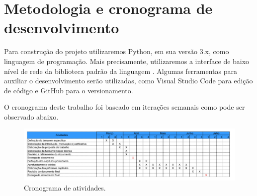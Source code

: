 \chapter{\label{chap:chap4} Metodologia e cronograma de desenvolvimento}
Para construção do projeto utilizaremos Python\cite{python}, em sua versão 3.x, como linguagem de programação.
Mais precisamente, utilizaremos a interface de baixo nível de rede da biblioteca padrão da linguagem \cite{socketPython}.
Algumas ferramentas para auxiliar o desenvolvimento serão utilizadas, como Visual Studio Code\cite{vscode} para edição de código e GitHub\cite{github} para o versionamento.

O cronograma deste trabalho foi baseado em iterações semanais como pode ser observado abaixo.
\begin{figure}[htb!]
    \centering\includegraphics[width=1\textwidth]{fig3.pdf}
    \caption%
    {\label{fig:fig3} Cronograma de atividades.}
\end{figure} 



